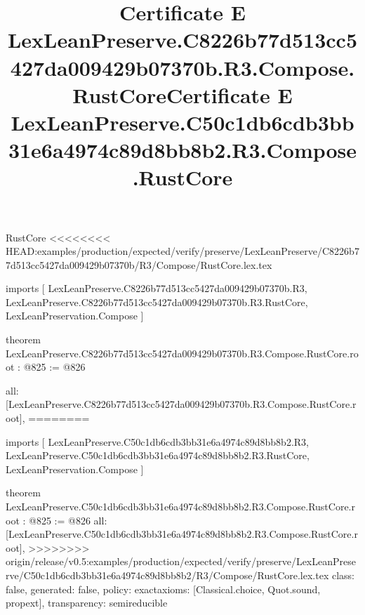 \begin{lexlean}{RustCore}
<<<<<<<< HEAD:examples/production/expected/verify/preserve/LexLeanPreserve/C8226b77d513cc5427da009429b07370b/R3/Compose/RustCore.lex.tex
\title{Certificate E LexLeanPreserve.C8226b77d513cc5427da009429b07370b.R3.Compose.RustCore}
\begin{coremodule}
imports [
  LexLeanPreserve.C8226b77d513cc5427da009429b07370b.R3,
  LexLeanPreserve.C8226b77d513cc5427da009429b07370b.R3.RustCore,
  LexLeanPreservation.Compose
]

theorem LexLeanPreserve.C8226b77d513cc5427da009429b07370b.R3.Compose.RustCore.root : @825 := @826 {
  all: [LexLeanPreserve.C8226b77d513cc5427da009429b07370b.R3.Compose.RustCore.root],
========
\title{Certificate E LexLeanPreserve.C50c1db6cdb3bb31e6a4974c89d8bb8b2.R3.Compose.RustCore}
\begin{coremodule}
imports [
  LexLeanPreserve.C50c1db6cdb3bb31e6a4974c89d8bb8b2.R3,
  LexLeanPreserve.C50c1db6cdb3bb31e6a4974c89d8bb8b2.R3.RustCore,
  LexLeanPreservation.Compose
]

theorem LexLeanPreserve.C50c1db6cdb3bb31e6a4974c89d8bb8b2.R3.Compose.RustCore.root : @825 := @826 {
  all: [LexLeanPreserve.C50c1db6cdb3bb31e6a4974c89d8bb8b2.R3.Compose.RustCore.root],
>>>>>>>> origin/release/v0.5:examples/production/expected/verify/preserve/LexLeanPreserve/C50c1db6cdb3bb31e6a4974c89d8bb8b2/R3/Compose/RustCore.lex.tex
  class: false,
  generated: false,
  policy: exact{axioms: [Classical.choice, Quot.sound, propext]},
  transparency: semireducible
}


\end{coremodule}}
\end{coremodule}
\end{lexlean}
